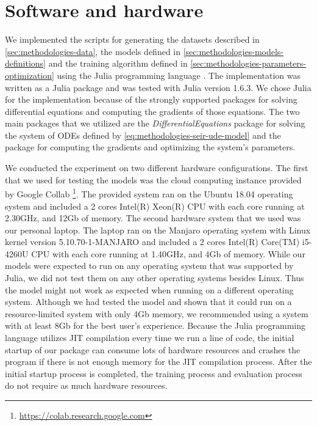 \section{Software and hardware}

We implemented the scripts for generating the datasets described in \autoref{sec:methodologies-data}, the models defined in \autoref{sec:methodologies-models-definitions} and the training algorithm defined in \autoref{sec:methodologies-parameters-optimization} using the Julia programming language \cite{bezanson2012julia}.
The implementation was written as a Julia package and was tested with Julia version 1.6.3.
We chose Julia for the implementation because of the strongly supported packages for solving differential equations and computing the gradients of those equations.
The two main packages that we utilized are the \textit{DifferentialEquations} package \cite{rackauckas2017differentialequations} for solving the system of \glspl{ODE} defined by \autoref{eq:methodologies-seir-ude-model} and the  \cite{rackauckasUniversalDifferentialEquations2020} package for computing the gradients and optimizing the system's parameters.

We conducted the experiment on two different hardware configurations.
The first that we used for testing the models was the cloud computing instance provided by Google Collab \footnote{\url{https://colab.research.google.com}}.
The provided system ran on the Ubuntu 18.04 operating system and included a 2 cores Intel(R) Xeon(R) CPU with each core running at 2.30GHz, and 12Gb of memory.
The second hardware system that we used was our personal laptop.
The laptop ran on the Manjaro operating system with Linux kernel version 5.10.70-1-MANJARO and included a 2 cores Intel(R) Core(TM) i5-4260U CPU with each core running at 1.40GHz, and 4Gb of memory.
While our models were expected to run on any operating system that was supported by Julia, we did not test them on any other operating systems besides Linux.
Thus the model might not work as expected when running on a different operating system.
Although we had tested the model and shown that it could run on a resource-limited system with only 4Gb memory, we recommended using a system with at least 8Gb for the best user's experience.
Because the Julia programming language utilizes \gls{JIT} compilation every time we run a line of code, the initial startup of our package can consume lots of hardware resources and crashes the program if there is not enough memory for the \gls{JIT} compilation process.
After the initial startup process is completed, the training process and evaluation process do not require as much hardware resources.